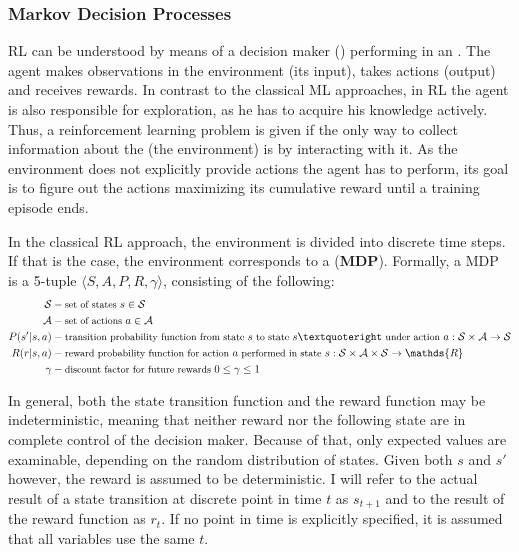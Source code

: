 \subsubsection{Markov Decision Processes}

RL can be understood by means of a decision maker () performing in an . The agent makes observations in the environment (its input), takes actions (output) and receives rewards. In contrast to the classical ML approaches, in RL the agent is also responsible for exploration, as he has to acquire his knowledge actively. Thus, a reinforcement learning problem is given if the only way to collect information about the  (the environment) is by interacting with it. As the environment does not explicitly provide actions the agent has to perform, its goal is to figure out the actions maximizing its cumulative reward until a training episode ends.

In the classical RL approach, the environment is divided into discrete time steps. If that is the case, the environment corresponds to a  (\textbf{MDP}). Formally, a MDP is a 5-tuple $\langle S, A, P, R, \gamma \rangle$, consisting of the following:\\
\begin{align*}
\mathcal{S} &- \text{\small set of states } s\in \mathcal{S}\\
\mathcal{A} &- \text{\small set of actions } a \in \mathcal{A}\\
P(s'|s, a) &- \text{\small transition probability function from state } s \text{\small ~to state } s’ \text{\small ~under action } a: \mathcal{S} \times \mathcal{A} \rightarrow \mathcal{S} \\
R(r|s, a) &- \text{\small reward probability function for action } a \text{\small ~performed in state } s: \mathcal{S} \times \mathcal{A} \times \mathcal{S} \rightarrow \mathds{R} \\
\gamma &- \text{\small discount factor for future rewards } 0 \leq \gamma \leq 1
\end{align*}

In general, both the state transition function and the reward function may be indeterministic, meaning that neither reward nor the following state are in complete control of the decision maker. Because of that, only expected values are examinable, depending on the random distribution of states. Given both $s$ and $s'$ however, the reward is assumed to be deterministic. I will refer to the actual result of a state transition at discrete point in time $t$ as $s_{t+1}$ and to the result of the reward function as $r_t$. If no point in time is explicitly specified, it is assumed that all variables use the same $t$.\\

